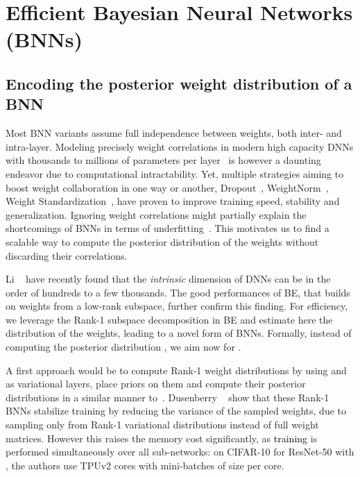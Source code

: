 \documentclass[10pt,twocolumn,letterpaper]{article}
\newcommand{\ab}[1]{\textcolor{black}{#1}}
\begin{document}
 
\section{Efficient Bayesian Neural Networks (BNNs) }\label{section:approach}




\subsection{Encoding the posterior weight distribution of a BNN}

Most BNN variants assume full independence between weights, both inter- and intra-layer. Modeling precisely weight correlations in modern high capacity DNNs with thousands to millions of parameters per layer~\cite{he2016deep} is however a daunting endeavor due to computational intractability. Yet, multiple strategies aiming to boost weight collaboration in one way or another, \eg Dropout~\cite{srivastava2014dropout}, WeightNorm~\cite{salimans2016weight}, Weight Standardization~\cite{qiao2019weight}, have proven to improve training speed, stability and generalization. Ignoring weight correlations might partially explain the shortcomings of BNNs in terms of underfitting~\cite{ovadia2019can, dusenberry2020efficient}. This motivates us to find a scalable way to compute the posterior distribution of the weights without discarding their correlations.


Li \etal~\cite{li2018intrinsic} have recently found that the \emph{intrinsic} dimension of DNNs can be in the order of hundreds to a few thousands. The good performances of BE, that builds on weights from a low-rank subspace, further confirm this finding. For efficiency, we leverage the Rank-1 subspace decomposition in BE and estimate here the distribution of the weights, leading to a novel form of BNNs. Formally, instead of computing the posterior distribution , we aim now for .

A first approach would be to compute Rank-1 weight distributions by using  and  as variational layers, place priors on them and compute their posterior distributions in a similar manner to~\cite{blundell2015weight}. Dusenberry \etal~\cite{dusenberry2020efficient} show that these Rank-1 BNNs stabilize training by reducing the variance of the sampled weights, due to sampling only from Rank-1 variational distributions instead of full weight matrices. However this raises the memory cost significantly, as 
\ab{training} is performed simultaneously over all  sub-networks: on CIFAR-10 for ResNet-50 with , the authors use  TPUv2 cores with mini-batches of size  per core.
\end{document}
